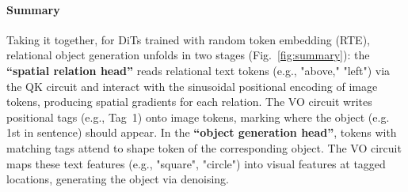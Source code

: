 \documentclass[10pt,twocolumn,letterpaper]{article}
\begin{document}





\paragraph{Summary}
Taking it together, for DiTs trained with random token embedding (RTE), relational object generation unfolds in two stages (Fig.~\ref{fig:summary}): 
the \textbf{``spatial relation head''} reads relational text tokens (e.g., "above," "left") via the QK circuit and interact with the sinusoidal positional encoding of image tokens, producing spatial gradients for each relation. 
The VO circuit writes positional tags (e.g., Tag~1) onto image tokens, marking where the object (e.g. 1st in sentence) should appear.
In the \textbf{``object generation head''}, tokens with matching tags attend to shape token of the corresponding object. 
The VO circuit maps these text features (e.g., "square", "circle") into visual features at tagged locations, generating the object via denoising.

\end{document}

